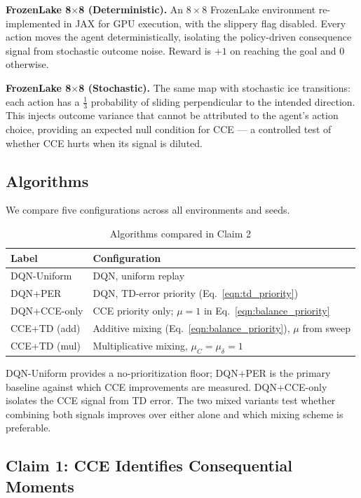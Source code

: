 \documentclass[conference]{IEEEtran}
\begin{document}
\textbf{FrozenLake 8$\times$8 (Deterministic).} An $8\times8$ FrozenLake environment re-implemented in JAX for GPU execution, with the slippery flag disabled. Every action moves the agent deterministically, isolating the policy-driven consequence signal from stochastic outcome noise. Reward is $+1$ on reaching the goal and $0$ otherwise.

\textbf{FrozenLake 8$\times$8 (Stochastic).} The same map with stochastic ice transitions: each action has a $\frac{1}{3}$ probability of sliding perpendicular to the intended direction. This injects outcome variance that cannot be attributed to the agent's action choice, providing an expected null condition for CCE — a controlled test of whether CCE hurts when its signal is diluted.

\subsection{Algorithms}

\noindent We compare five configurations across all environments and seeds.

\begin{table}[htbp]
\caption{Algorithms compared in Claim 2}
\begin{center}
\begin{tabular}{|l|l|}
\hline
\textbf{Label} & \textbf{Configuration} \\
\hline
DQN-Uniform    & DQN, uniform replay \\
DQN+PER        & DQN, TD-error priority (Eq.~\ref{eqn:td_priority}) \\
DQN+CCE-only   & CCE priority only; $\mu=1$ in Eq.~\ref{eqn:balance_priority} \\
CCE+TD (add)   & Additive mixing (Eq.~\ref{eqn:balance_priority}), $\mu$ from sweep \\
CCE+TD (mul)   & Multiplicative mixing, $\mu_C=\mu_\delta=1$ \\
\hline
\end{tabular}
\end{center}
\end{table}

\noindent DQN-Uniform provides a no-prioritization floor; DQN+PER is the primary baseline against which CCE improvements are measured. DQN+CCE-only isolates the CCE signal from TD error. The two mixed variants test whether combining both signals improves over either alone and which mixing scheme is preferable.

\subsection{Claim 1: CCE Identifies Consequential Moments}
\end{document}
